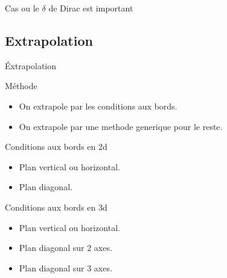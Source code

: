 \begin{frame}{Cas ou le $\delta$ de Dirac est important}
\begin{figure}
\centering
{}
\label{topo:mult_part_error}
\end{figure}
\end{frame}
\subsection{Extrapolation}
\begin{frame}{Éxtrapolation}
 
 \begin{block}{Méthode}
  \begin{itemize}
   \item On extrapole par les conditions aux bords.
   \item On extrapole par une methode generique pour le reste.
  \end{itemize}

 \end{block}
 
 \begin{block}{Conditions aux bords en 2d}
  \begin{itemize}
   \item Plan vertical ou horizontal.
   \item Plan diagonal.
  \end{itemize}

 \end{block}
 
 \begin{block}{Conditions aux bords en 3d}
  \begin{itemize}
   \item Plan vertical ou horizontal.
   \item Plan diagonal sur 2 axes.
   \item Plan diagonal sur 3 axes.
  \end{itemize}

 \end{block}


\end{frame}

